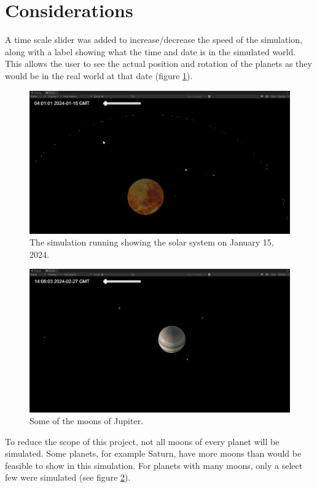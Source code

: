 \documentclass{article}
\begin{document}
    \section{Considerations}
    A time scale slider was added to increase/decrease the speed of the simulation, along with a label showing what the time and date is in the simulated world. This allows the user to see the actual position and rotation of the planets as they would be in the real world at that date (figure \ref{date}).
    \begin{figure}[h]
        \centering
        \includegraphics[scale=0.25]{date_time.png}
        \caption{The simulation running showing the solar system on January 15, 2024.}
        \label{date}
    \end{figure}
    \begin{figure}[h]
        \centering
        \includegraphics[scale=0.25]{jupiter.png}
        \caption{Some of the moons of Jupiter.}
        \label{jupiter}
    \end{figure}
    To reduce the scope of this project, not all moons of every planet will be simulated. Some planets, for example Saturn, have more moons than would be feasible to show in this simulation. For planets with many moons, only a select few were simulated (see figure \ref{jupiter}).
\end{document}
